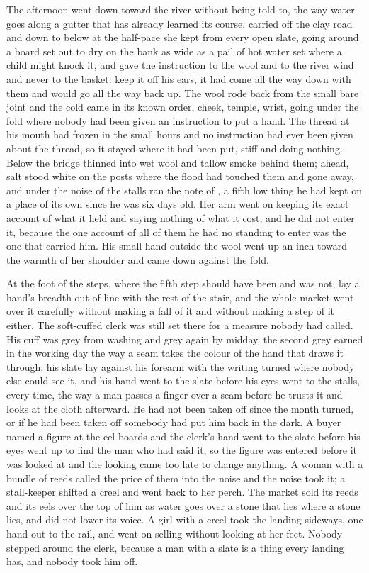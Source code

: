 The afternoon went down toward the river without being told to, the way water goes along a gutter that has already learned its course.  carried  off the clay road and down to  below  at the half-pace she kept from every open slate, going around a board set out to dry on the bank as wide as a pail of hot water set where a child might knock it, and gave the instruction to the wool and to the river wind and never to the basket: keep it off his ears, it had come all the way down with them and would go all the way back up. The wool rode back from the small bare joint and the cold came in its known order, cheek, temple, wrist, going under the fold where nobody had been given an instruction to put a hand. The thread at his mouth had frozen in the small hours and no instruction had ever been given about the thread, so it stayed where it had been put, stiff and doing nothing. Below the bridge  thinned into wet wool and tallow smoke behind them; ahead, salt stood white on the posts where the flood had touched them and gone away, and under the noise of the stalls ran the note of , a fifth low thing he had kept on a place of its own since he was six days old. Her arm went on keeping its exact account of what it held and saying nothing of what it cost, and he did not enter it, because the one account of all of them he had no standing to enter was the one that carried him. His small hand outside the wool went up an inch toward the warmth of her shoulder and came down against the fold.

At the foot of the steps, where the fifth step should have been and was not,  lay a hand's breadth out of line with the rest of the stair, and the whole market went over it carefully without making a fall of it and without making a step of it either. The soft-cuffed clerk was still set there for a measure nobody had called. His cuff was grey from washing and grey again by midday, the second grey earned in the working day the way a seam takes the colour of the hand that draws it through; his slate lay against his forearm with the writing turned where nobody else could see it, and his hand went to the slate before his eyes went to the stalls, every time, the way a man passes a finger over a seam before he trusts it and looks at the cloth afterward. He had not been taken off since the month turned, or if he had been taken off somebody had put him back in the dark. A buyer named a figure at the eel boards and the clerk's hand went to the slate before his eyes went up to find the man who had said it, so the figure was entered before it was looked at and the looking came too late to change anything. A woman with a bundle of reeds called the price of them into the noise and the noise took it; a stall-keeper shifted a creel and went back to her perch. The market sold its reeds and its eels over the top of him as water goes over a stone that lies where a stone lies, and did not lower its voice. A girl with a creel took the landing sideways, one hand out to the rail, and went on selling without looking at her feet. Nobody stepped around the clerk, because a man with a slate is a thing every landing has, and nobody took him off.

